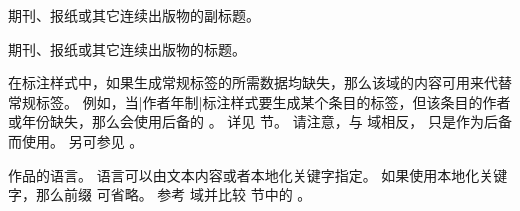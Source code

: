 \begin{fieldlist}



期刊、报纸或其它连续出版物的副标题。




期刊、报纸或其它连续出版物的标题。




在标注样式中，如果生成常规标签的所需数据均缺失，那么该域的内容可用来代替常规标签。
例如，当|作者年制|标注样式要生成某个条目的标签，但该条目的作者或年份缺失，那么会使用后备的 。
详见  节。
请注意，与  域相反， 只是作为后备而使用。
另可参见 。




作品的语言。
语言可以由文本内容或者本地化关键字指定。
如果使用本地化关键字，那么前缀  可省略。
参考  域并比较  节中的 。




\end{fieldlist}

